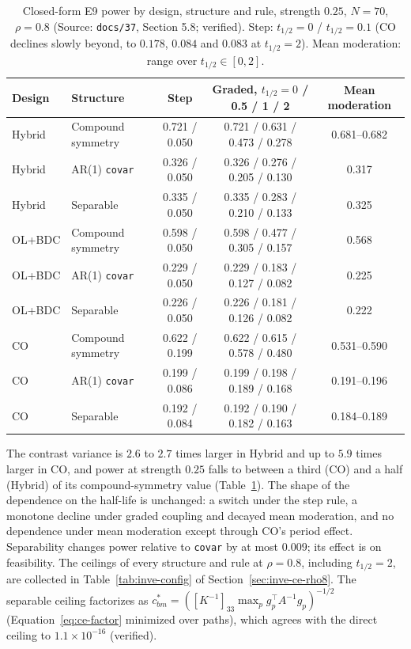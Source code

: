 \documentclass[11pt]{article}
\newcommand{\code}[1]{\texttt{#1}}
\begin{document}
\begin{table}[h]
\centering\small
\caption{Closed-form E9 power by design, structure and rule, strength
$0.25$, $N = 70$, $\rho = 0.8$ (Source: \code{docs/37}, Section 5.8;
verified). Step: $t_{1/2} = 0$ / $t_{1/2} = 0.1$ (CO declines slowly
beyond, to $0.178$, $0.084$ and $0.083$ at $t_{1/2} = 2$). Mean
moderation: range over $t_{1/2} \in [0, 2]$.}
\label{tab:inve-power-struct}
\begin{tabular}{@{}llccc@{}}
\toprule
Design & Structure & Step & Graded, $t_{1/2} = 0$ / 0.5 / 1 / 2 & Mean moderation \\
\midrule
Hybrid & Compound symmetry & 0.721 / 0.050 & 0.721 / 0.631 / 0.473 / 0.278 & 0.681--0.682 \\
Hybrid & AR(1) \code{covar} & 0.326 / 0.050 & 0.326 / 0.276 / 0.205 / 0.130 & 0.317 \\
Hybrid & Separable & 0.335 / 0.050 & 0.335 / 0.283 / 0.210 / 0.133 & 0.325 \\
OL+BDC & Compound symmetry & 0.598 / 0.050 & 0.598 / 0.477 / 0.305 / 0.157 & 0.568 \\
OL+BDC & AR(1) \code{covar} & 0.229 / 0.050 & 0.229 / 0.183 / 0.127 / 0.082 & 0.225 \\
OL+BDC & Separable & 0.226 / 0.050 & 0.226 / 0.181 / 0.126 / 0.082 & 0.222 \\
CO & Compound symmetry & 0.622 / 0.199 & 0.622 / 0.615 / 0.578 / 0.480 & 0.531--0.590 \\
CO & AR(1) \code{covar} & 0.199 / 0.086 & 0.199 / 0.198 / 0.189 / 0.168 & 0.191--0.196 \\
CO & Separable & 0.192 / 0.084 & 0.192 / 0.190 / 0.182 / 0.163 & 0.184--0.189 \\
\bottomrule
\end{tabular}
\end{table}

The contrast variance is $2.6$ to $2.7$ times larger in Hybrid and up
to $5.9$ times larger in CO, and power at strength $0.25$ falls to
between a third (CO) and a half (Hybrid) of its compound-symmetry value
(Table~\ref{tab:inve-power-struct}). The shape of the dependence on the
half-life is unchanged: a switch under the step rule, a monotone decline
under graded coupling and decayed mean moderation, and no dependence
under mean moderation except through CO's period effect. Separability
changes power relative to \code{covar} by at most $0.009$; its effect is
on feasibility. The ceilings of every structure and rule at
$\rho = 0.8$, including $t_{1/2} = 2$, are collected in
Table~\ref{tab:inve-config} of Section~\ref{sec:inve-ce-rho8}. The
separable ceiling factorizes as
$c_{bm}^{\ast} = ([K^{-1}]_{33}\max_p g_p^\top A^{-1} g_p)^{-1/2}$
(Equation~\eqref{eq:ce-factor} minimized over paths), which agrees with
the direct ceiling to $1.1\times10^{-16}$ (verified).
\end{document}
